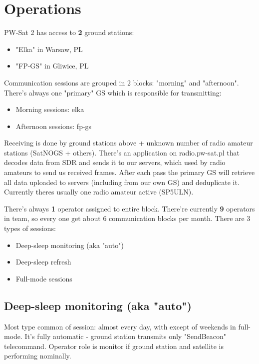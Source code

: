 \section {Operations}

PW-Sat 2 has access to \textbf{2} ground stations:

\begin{itemize}
\item "Elka" in Warsaw, PL
\item "FP-GS" in Gliwice, PL    
\end{itemize}

Communication sessions are grouped in 2 blocks: "morning" and "afternoon".
There's always one "primary" GS which is responsible for transmitting:
\begin{itemize}
\item Morning sessions: elka
\item Afternoon sessions: fp-gs
\end{itemize}

Receiving is done by ground stations above + unknown number of radio amateur stations (SatNOGS + others). There's an application on radio.pw-sat.pl that decodes data from SDR and sends it to our servers, which used by radio amateurs to send us received frames. After each pass the primary GS will retrieve all data uploaded to servers (including from our own GS) and deduplicate it. Currently theres usually one radio amateur active (SP5ULN).

There's always \textbf{1} operator assigned to entire block. There're currently \textbf{9} operators in team, so every one get about 6 communication blocks per month.
There are 3 types of sessions:
\begin{itemize}    
    \item Deep-sleep monitoring (aka "auto")
    \item Deep-sleep refresh
    \item Full-mode sessions
\end{itemize}

\subsection{Deep-sleep monitoring (aka "auto")}        
Most type common of session: almost every day, with except of weekends in full-mode.  It's fully automatic - ground station transmits only "SendBeacon" telecommand. Operator role is monitor if ground station and satellite is performing nominally. 

